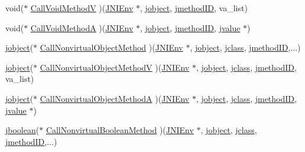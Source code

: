 \begin{DoxyCompactItemize}
\item 
void($\ast$ \hyperlink{struct_j_n_i_native_interface_af603752cf6192eb3c6a86608c0b37ab3}{Call\-Void\-Method\-V} )(\hyperlink{jni_8h_a2d06d32b6b6f1519799078a36fe2e380}{J\-N\-I\-Env} $\ast$, \hyperlink{jni_8h_a24647d2a2f02c39f6338c2c6ce4c1004}{jobject}, \hyperlink{jni_8h_a91d8a65fefade9d27c9f749e69f37c40}{jmethod\-I\-D}, va\-\_\-list)
\item 
void($\ast$ \hyperlink{struct_j_n_i_native_interface_aa8c9c1b4adb267e320bcedb71899ad1a}{Call\-Void\-Method\-A} )(\hyperlink{jni_8h_a2d06d32b6b6f1519799078a36fe2e380}{J\-N\-I\-Env} $\ast$, \hyperlink{jni_8h_a24647d2a2f02c39f6338c2c6ce4c1004}{jobject}, \hyperlink{jni_8h_a91d8a65fefade9d27c9f749e69f37c40}{jmethod\-I\-D}, \hyperlink{unionjvalue}{jvalue} $\ast$)
\item 
\hyperlink{jni_8h_a24647d2a2f02c39f6338c2c6ce4c1004}{jobject}($\ast$ \hyperlink{struct_j_n_i_native_interface_a379a7834ae4c015efb4996f2d0d9a4e4}{Call\-Nonvirtual\-Object\-Method} )(\hyperlink{jni_8h_a2d06d32b6b6f1519799078a36fe2e380}{J\-N\-I\-Env} $\ast$, \hyperlink{jni_8h_a24647d2a2f02c39f6338c2c6ce4c1004}{jobject}, \hyperlink{jni_8h_a5b236a554a9caf14a835f4e83b4c16b3}{jclass}, \hyperlink{jni_8h_a91d8a65fefade9d27c9f749e69f37c40}{jmethod\-I\-D},...)
\item 
\hyperlink{jni_8h_a24647d2a2f02c39f6338c2c6ce4c1004}{jobject}($\ast$ \hyperlink{struct_j_n_i_native_interface_a13d0d3b36ddc094fdbdd7f5154374c1b}{Call\-Nonvirtual\-Object\-Method\-V} )(\hyperlink{jni_8h_a2d06d32b6b6f1519799078a36fe2e380}{J\-N\-I\-Env} $\ast$, \hyperlink{jni_8h_a24647d2a2f02c39f6338c2c6ce4c1004}{jobject}, \hyperlink{jni_8h_a5b236a554a9caf14a835f4e83b4c16b3}{jclass}, \hyperlink{jni_8h_a91d8a65fefade9d27c9f749e69f37c40}{jmethod\-I\-D}, va\-\_\-list)
\item 
\hyperlink{jni_8h_a24647d2a2f02c39f6338c2c6ce4c1004}{jobject}($\ast$ \hyperlink{struct_j_n_i_native_interface_a9c82c9f35ded2ff98df433dd8b888589}{Call\-Nonvirtual\-Object\-Method\-A} )(\hyperlink{jni_8h_a2d06d32b6b6f1519799078a36fe2e380}{J\-N\-I\-Env} $\ast$, \hyperlink{jni_8h_a24647d2a2f02c39f6338c2c6ce4c1004}{jobject}, \hyperlink{jni_8h_a5b236a554a9caf14a835f4e83b4c16b3}{jclass}, \hyperlink{jni_8h_a91d8a65fefade9d27c9f749e69f37c40}{jmethod\-I\-D}, \hyperlink{unionjvalue}{jvalue} $\ast$)
\item 
\hyperlink{jni_8h_a3e597066bbafe45e3d729fc1f4f9829f}{jboolean}($\ast$ \hyperlink{struct_j_n_i_native_interface_a67b30893aa6ae36ee73e6a491625e377}{Call\-Nonvirtual\-Boolean\-Method} )(\hyperlink{jni_8h_a2d06d32b6b6f1519799078a36fe2e380}{J\-N\-I\-Env} $\ast$, \hyperlink{jni_8h_a24647d2a2f02c39f6338c2c6ce4c1004}{jobject}, \hyperlink{jni_8h_a5b236a554a9caf14a835f4e83b4c16b3}{jclass}, \hyperlink{jni_8h_a91d8a65fefade9d27c9f749e69f37c40}{jmethod\-I\-D},...)

\end{DoxyCompactItemize}
